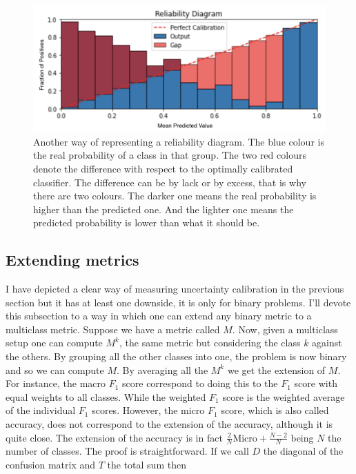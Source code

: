\begin{figure}[ht]
    \centering
    \includegraphics[width=\textwidth]{imgs/rel2.png}
    \caption{Another way of representing a reliability diagram. The blue colour is the real probability of a class in that group. The two red colours denote the difference with respect to the optimally calibrated classifier. The difference can be by lack or by excess, that is why there are two colours. The darker one means the real probability is higher than the predicted one. And the lighter one means the predicted probability is lower than what it should be.}
    \label{fig:rel2}
\end{figure}

\subsection{Extending metrics}

I have depicted a clear way of measuring uncertainty calibration in the previous section but it has at least one downside, it is only for binary problems. I'll devote this subsection to a way in which one can extend any binary metric to a multiclass metric. Suppose we have a metric called $M$.  Now, given a multiclass setup one can compute $M^k$, the same metric but considering the class $k$ against the others. By grouping all the other classes into one, the problem is now binary and so we can compute $M$. By averaging all the $M^k$ we get the extension of $M$. For instance, the macro $F_1$ score correspond to doing this to the $F_1$ score with equal weights to all classes. While the weighted $F_1$ score is the weighted average of the individual $F_1$ scores. However, the micro $F_1$ score, which is also called accuracy, does not correspond to the extension of the accuracy, although it is quite close. The extension of the accuracy is in fact $\frac{2}{N} \text{Micro} + \frac{N-2}{N}$ being $N$ the number of classes. The proof is straightforward. If we call $D$ the diagonal of the confusion matrix and $T$ the total sum then

